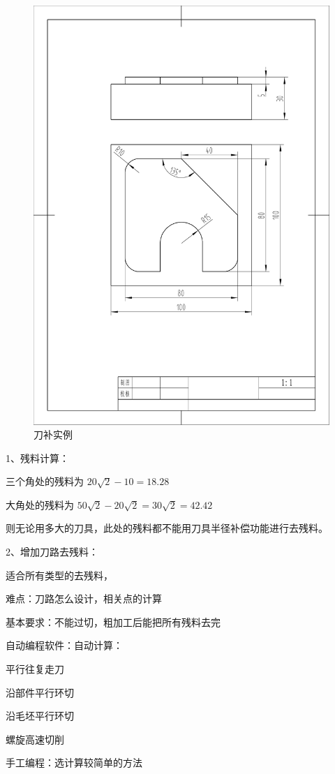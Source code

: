 \begin{figure}[h]
	\centering
	\includegraphics[width=0.8\linewidth,trim=130 200 80  120,clip]{data/image/14-1.jpg}
	\caption{刀补实例}
	\label{fig:14-1}
\end{figure}

1、残料计算：

三个角处的残料为 $20\sqrt{2}-10=18.28$

大角处的残料为  $50\sqrt{2}-20\sqrt{2}=30\sqrt{2}=42.42$

则无论用多大的刀具，此处的残料都不能用刀具半径补偿功能进行去残料。

2、增加刀路去残料：

适合所有类型的去残料，

难点：刀路怎么设计，相关点的计算

基本要求：不能过切，粗加工后能把所有残料去完

自动编程软件：自动计算：

平行往复走刀

沿部件平行环切

沿毛坯平行环切

螺旋高速切削

手工编程：选计算较简单的方法

